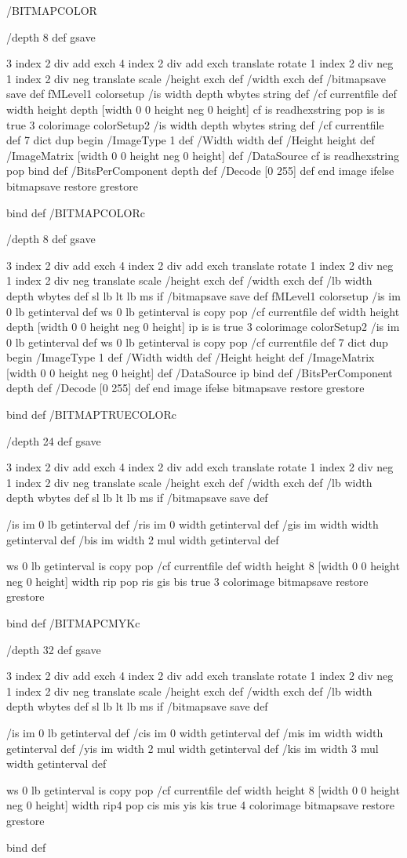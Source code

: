 /BITMAPCOLOR { 
	/depth 8 def
	gsave
	
	3 index 2 div add exch	
	4 index 2 div add exch	
	translate		
	rotate			
	1 index 2 div neg	
	1 index 2 div neg	
	translate		
	scale			
	/height exch def /width exch def
	/bitmapsave save def
	fMLevel1 {	
		colorsetup
		/is width depth wbytes string def
		/cf currentfile def 
		width height depth [width 0 0 height neg 0 height] 
		{cf is readhexstring pop} {is} {is} true 3 colorimage 
	} {
		colorSetup2
		/is width depth wbytes string def
		/cf currentfile def 
		7 dict dup begin
			/ImageType 1 def
			/Width width def
			/Height height def
			/ImageMatrix [width 0 0 height neg 0 height] def
			/DataSource {cf is readhexstring pop} bind def
			/BitsPerComponent depth def
			/Decode [0 255] def
		end image	
	} ifelse
	bitmapsave restore 
	grestore
	} bind def
/BITMAPCOLORc { 
	/depth 8 def
	gsave
	
	3 index 2 div add exch	
	4 index 2 div add exch	
	translate		
	rotate			
	1 index 2 div neg	
	1 index 2 div neg	
	translate		
	scale			
	/height exch def /width exch def
	/lb width depth wbytes def 
	sl lb lt {lb ms} if 
	/bitmapsave save def 
	fMLevel1 {	
		colorsetup
		/is im 0 lb getinterval def 
		ws 0 lb getinterval is copy pop 
		/cf currentfile def 
		width height depth [width 0 0 height neg 0 height] 
		{ip} {is} {is} true 3 colorimage
	} {
		colorSetup2
		/is im 0 lb getinterval def 
		ws 0 lb getinterval is copy pop 
		/cf currentfile def 
		7 dict dup begin
			/ImageType 1 def
			/Width width def
			/Height height def
			/ImageMatrix [width 0 0 height neg 0 height] def
			/DataSource {ip} bind def
			/BitsPerComponent depth def
			/Decode [0 255] def
		end image	
	} ifelse
	bitmapsave restore 
	grestore
	} bind def
/BITMAPTRUECOLORc { 
	/depth 24 def
        gsave
 	
	3 index 2 div add exch	
	4 index 2 div add exch	
	translate		
	rotate			
	1 index 2 div neg	
	1 index 2 div neg	
	translate		
	scale			
	/height exch def /width exch def
	/lb width depth wbytes def 
	sl lb lt {lb ms} if 
	/bitmapsave save def 
        
	/is im 0 lb getinterval def	
	/ris im 0 width getinterval def	
	/gis im width width getinterval def	
	/bis im width 2 mul width getinterval def 
        
	ws 0 lb getinterval is copy pop 
	/cf currentfile def 
	width height 8 [width 0 0 height neg 0 height] 
	{width rip pop ris} {gis} {bis} true 3 colorimage
	bitmapsave restore 
	grestore
	} bind def
/BITMAPCMYKc { 
	/depth 32 def
        gsave
 	
	3 index 2 div add exch	
	4 index 2 div add exch	
	translate		
	rotate			
	1 index 2 div neg	
	1 index 2 div neg	
	translate		
	scale			
	/height exch def /width exch def
	/lb width depth wbytes def 
	sl lb lt {lb ms} if 
	/bitmapsave save def 
        
	/is im 0 lb getinterval def	
	/cis im 0 width getinterval def	
	/mis im width width getinterval def	
	/yis im width 2 mul width getinterval def 
	/kis im width 3 mul width getinterval def 
        
	ws 0 lb getinterval is copy pop 
	/cf currentfile def 
	width height 8 [width 0 0 height neg 0 height] 
	{width rip4 pop cis} {mis} {yis} {kis} true 4 colorimage
	bitmapsave restore 
	grestore
	} bind def
